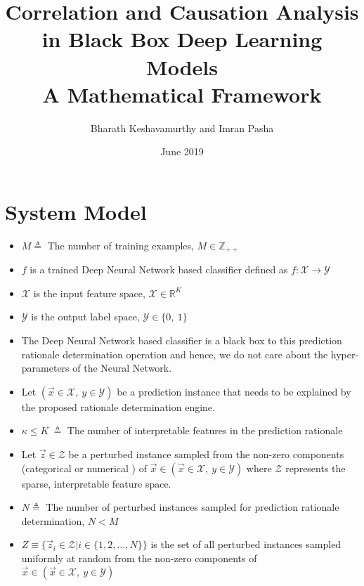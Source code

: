 \documentclass{article}
\title{%
      Correlation and Causation Analysis in Black Box Deep Learning Models \\
      \large A Mathematical Framework}
\author{Bharath Keshavamurthy and Imran Pasha}
\affil{CISCO Systems, Inc.}
\date{June 2019}
\begin{document}
\maketitle
\section{System Model}
\begin{itemize}
    \item $M \triangleq $ The number of training examples, $M \in \mathbb{Z}_{++}$
    \item $f$ is a trained Deep Neural Network based classifier defined as $f: \mathcal{X} \rightarrow \mathcal{Y}$
    \item $\mathcal{X}$ is the input feature space, $\mathcal{X} \in \mathbb{R}^{K}$
    \item $\mathcal{Y}$ is the output label space, $\mathcal{Y} \in \{0,\ 1\}$
    \item The Deep Neural Network based classifier is a black box to this prediction rationale determination operation and hence, we do not care about the hyper-parameters of the Neural Network.
    \item Let $(\vec{x} \in \mathcal{X},\ y \in \mathcal{Y})$ be a prediction instance that needs to be explained by the proposed rationale determination engine. 
    \item $\kappa \leq K\ \triangleq $ The number of interpretable features in the prediction rationale
    \item Let $\vec{z} \in \mathcal{Z}$ be a perturbed instance sampled from the non-zero components (categorical or numerical ) of $\vec{x} \in (\vec{x} \in \mathcal{X},\ y \in \mathcal{Y})$ where $\mathcal{Z}$ represents the sparse, interpretable feature space.
    \item $N \triangleq $ The number of perturbed instances sampled for prediction rationale determination, $N < M$
    \item $Z \equiv \{\vec{z}_i \in \mathcal{Z} | i \in \{1, 2, \dots, N\}\}$ is the set of all perturbed instances sampled uniformly at random from the non-zero components of \\ $\vec{x} \in (\vec{x} \in \mathcal{X},\ y \in \mathcal{Y})$
\end{itemize}
\end{document}
